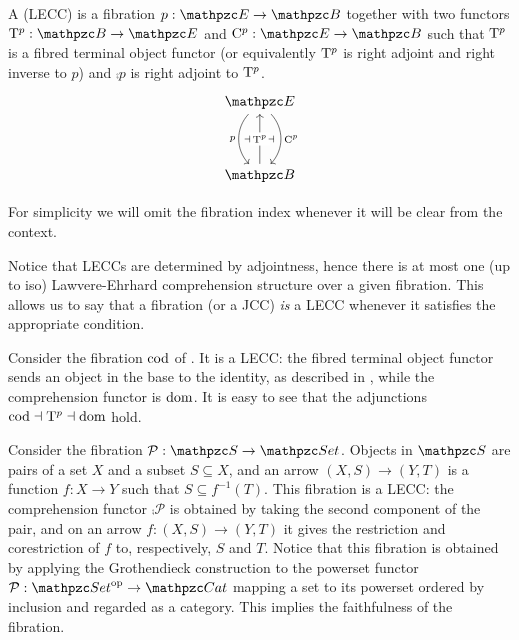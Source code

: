 \documentclass{lmcs} %
\theoremstyle{plain}\newtheorem{satz}[thm]{Satz} %
\begin{document}
			\begin{defi}
				A  (LECC) is a fibration $p:\ct{E}\rightarrow\ct{B}$ together with two functors $\term{p}:\ct{B}\rightarrow\ct{E}$ and $\comp{p}:\ct{E}\rightarrow\ct{B}$ such that $\mathrm{T}^{p}$ is a fibred terminal object functor (or equivalently $\mathrm{T}^{p}$ is right adjoint and right inverse to $p$) and $\comp{p}$ is right adjoint to $\mathrm{T}^{p}$.
				\[\begin{tikzcd}
					{\ct{E}} \\
					\\
					{\ct{B}}
					\arrow[""{name=0, anchor=center, inner sep=0}, "{\comp{p}}", bend left=10ex, from=1-1, to=3-1]
					\arrow[""{name=1, anchor=center, inner sep=0}, "p"', bend right=10ex, from=1-1, to=3-1]
					\arrow[""{name=2, anchor=center, inner sep=0}, "{\term{p}}"{description}, from=3-1, to=1-1]
					\arrow["\dashv"{anchor=center}, draw=none, from=1, to=2, pos=0.4]
					\arrow["\dashv"{anchor=center}, draw=none, from=2, to=0, pos=0.55]
				\end{tikzcd}\]
			\end{defi}
			For simplicity we will omit the fibration index whenever it will be clear from the context.
			
			Notice that LECCs are determined by adjointness, hence there is at most one (up to iso) Lawvere-Ehrhard comprehension structure over a given fibration. This allows us to say that a fibration (or a JCC) \emph{is} a LECC whenever it satisfies the appropriate condition.
						
			\begin{exa}
				Consider the fibration $\mathop{\mathrm{cod}}\nolimits$ of . It is a LECC: the fibred terminal object functor sends an object in the base to the identity, as described in , while the comprehension functor is $\mathop{\mathrm{dom}}\nolimits$. It is easy to see that the adjunctions $\mathop{\mathrm{cod}}\nolimits\dashv \mathrm{T}^{p}\dashv \mathop{\mathrm{dom}}\nolimits$ hold.
			\end{exa}
			
			\begin{exa}
				Consider the fibration $\mathcal{P}:\ct{S}\to\ctset$. Objects in $\ct{S}$ are pairs of a set $X$ and a subset $S\subseteq X$, and an arrow $(X,S)\to(Y,T)$ is a function $f:X\to Y$ such that $S\subseteq f^{-1}(T)$. This fibration is a LECC: the comprehension functor $\comp{\mathcal{P}}$ is obtained by taking the second component of the pair, and on an arrow $f:(X,S)\to(Y,T)$ it gives the restriction and corestriction of $f$ to, respectively, $S$ and $T$. 
Notice that this fibration is obtained by applying the Grothendieck construction \cite{jacobs1999categorical} to the powerset functor $\mathcal{P}:\ctset\op\to\Cat$ mapping a set to its powerset ordered by inclusion and regarded as a category. This implies the faithfulness of the fibration.
			\end{exa}
			
\end{document}
